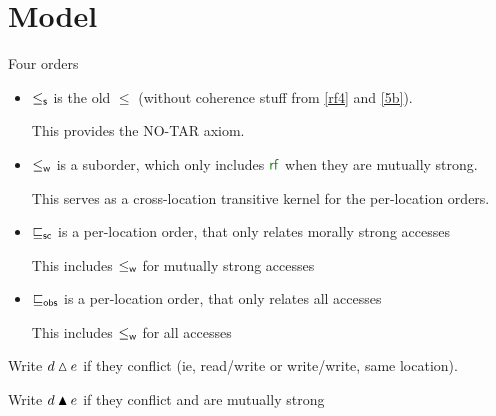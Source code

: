 \section{Model}

Four orders
\begin{itemize}
\item $\le_\mathsf{s}$ is the old $\le$ (without coherence stuff from \ref{rf4} and \ref{5b}).

  This provides the NO-TAR axiom.
\item $\le_\mathsf{w}$ is a suborder, which only includes $\rrf$ when they are mutually strong.

  This serves as a cross-location transitive kernel for the per-location orders.
  
\item $\sqsubseteq_\mathsf{sc}$ is a per-location order, that only relates morally strong accesses

  This includes $\le_\mathsf{w}$ for mutually strong accesses
\item $\sqsubseteq_\mathsf{obs}$ is a per-location order, that only relates all accesses

  This includes $\le_\mathsf{w}$ for all accesses
\end{itemize}

Write $d\mathbin{\vartriangle}e$ if they conflict (ie, read/write or write/write, same location).

Write $d\mathbin{\blacktriangle}e$ if they conflict and are mutually strong

